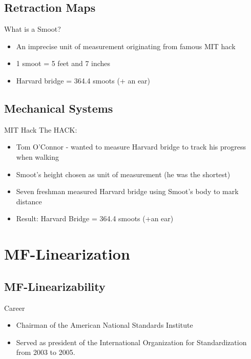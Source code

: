 \documentclass{beamer}
\begin{document}
\subsection{Retraction Maps}

\begin{frame}{What is a Smoot?}
  \begin{itemize}
    \item An imprecise unit of measurement originating from famous MIT hack
    \item 1 smoot = 5 feet and 7 inches
    \item Harvard bridge = 364.4 smoots (+ an ear)
  \end{itemize}
\end{frame}

\subsection{Mechanical Systems}

\begin{frame}{MIT Hack}
  The HACK:
  \pause
  \begin{itemize}
    \item<2-> Tom O'Connor - wanted to measure Harvard bridge to track his progress when walking
    \item<3-> Smoot's height chosen as unit of measurement (he was the shortest)
    \item<4-> Seven freshman measured Harvard bridge using Smoot's body to mark distance
    \item<5-> Result: Harvard Bridge = 364.4 smoots (+an ear)
  \end{itemize}
\end{frame}

\section{MF-Linearization}
\subsection{MF-Linearizability}
\begin{frame}{Career}
  \begin{itemize}
    \item<1-> Chairman of the American National Standards Institute 
    \item<2-> Served as president of the International Organization for Standardization from 2003 to 2005.
  \end{itemize}
\end{frame}
\end{document}
